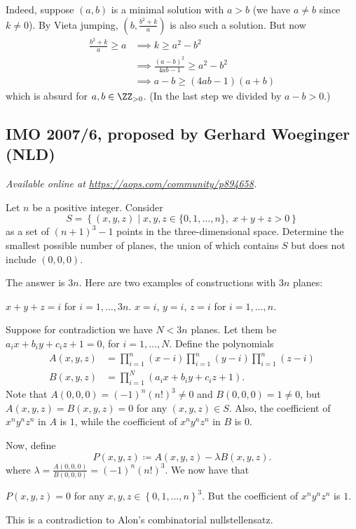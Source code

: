 \documentclass[11pt]{scrartcl}
\begin{document}
Indeed, suppose $(a, b)$ is a minimal solution with $a > b$
(we have $a \neq b$ since $k \neq 0$).
By Vieta jumping, $(b, \frac{b^2+k}{a})$ is also such a solution.
But now
\begin{align*}
  \frac{b^2+k}{a} \ge a &\implies k \ge a^2 - b^2 \\
  &\implies \frac{(a-b)^2}{4ab-1} \ge a^2-b^2 \\
  &\implies a-b \ge (4ab-1)(a+b)
\end{align*}
which is absurd for $a,b \in \ZZ_{>0}$.
(In the last step we divided by $a-b > 0$.)
\pagebreak

\subsection{IMO 2007/6, proposed by Gerhard Woeginger (NLD)}
\textsl{Available online at \url{https://aops.com/community/p894658}.}
\begin{mdframed}[style=mdpurplebox,frametitle={Problem statement}]
Let $n$ be a positive integer.
Consider
\[ S = \left\{ (x,y,z) \mid
  x,y,z \in \{ 0, 1, \dots, n\}, \;
  x+y+z > 0 \right\} \]
as a set of $(n+1)^3-1$ points in the three-dimensional space.
Determine the smallest possible number of planes,
the union of which contains $S$ but does not include $(0,0,0)$.
\end{mdframed}
The answer is $3n$.
Here are two examples of constructions with $3n$ planes:
\begin{itemize}
  \ii $x+y+z=i$ for $i=1,\dots,3n$.
  \ii $x=i$, $y=i$, $z=i$ for $i=1,\dots,n$.
\end{itemize}
Suppose for contradiction we have $N < 3n$ planes.
Let them be $a_i x + b_i y + c_i z + 1 = 0$, for $i = 1, \dots, N$.
Define the polynomials
\begin{align*}
  A(x,y,z) &= \prod_{i=1}^n (x-i) \prod_{i=1}^n (y-i) \prod_{i=1}^n (z-i) \\
  B(x,y,z) &= \prod_{i=1}^N \left( a_i x + b_i y + c_i z + 1 \right).
\end{align*}
Note that $A(0,0,0) = (-1)^n  (n!)^3 \neq 0$
and $B(0,0,0) =  1 \neq 0$,
but $A(x,y,z) = B(x,y,z) = 0$ for any $(x,y,z) \in S$.
Also, the coefficient of $x^n y^n z^n$ in $A$ is $1$,
while the coefficient of $x^n y^n z^n$ in $B$ is $0$.

Now, define
\[ P(x,y,z) \coloneqq A(x,y,z) - \lambda  B(x,y,z). \]
where $\lambda = \frac{A(0,0,0)}{B(0,0,0)} = (-1)^{n} (n!)^3$.
We now have that
\begin{itemize}
  \ii $P(x,y,z) = 0$ for any $x,y,z \in \left\{ 0,1,\dots,n \right\}^3$.
  \ii But the coefficient of $x^n y^n z^n$ is $1$.
\end{itemize}
This is a contradiction to Alon's combinatorial nullstellensatz.
\pagebreak
\end{document}
